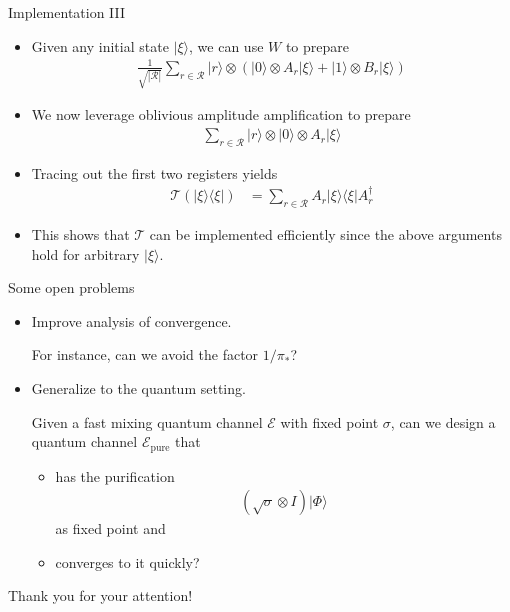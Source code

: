 \documentclass{beamer}
\renewcommand{\>}{\rangle}
\newcommand{\<}{\langle}
\newcommand{\cT}{\mathcal{T}}
\newcommand{\cR}{\mathcal{R}}
\begin{document}

\begin{frame}{Implementation III}
\begin{itemize}
    \item Given any initial state $|\xi\>$, we can use $W$ to prepare
    \begin{align*}
        \frac{1}{\sqrt{|\cR|}} 
        \sum_{r\in\cR}
        |r\> \otimes 
        (|0\> \otimes A_r|\xi\> + |1\> \otimes B_r|\xi\>) 
    \end{align*}

    \medskip
    \item We now leverage oblivious amplitude amplification to prepare
    \begin{align*}
        \sum_{r\in\cR} |r\> \otimes |0\> \otimes A_r|\xi\> 
    \end{align*}

    \item Tracing out the first two registers yields
    \begin{align*}
        \cT(|\xi\>\<\xi|)
        &=
        \sum_{r\in\cR} A_r |\xi\>\<\xi| A_r^\dagger
    \end{align*}

    \medskip
    \item This shows that $\cT$ can be implemented efficiently since the above arguments hold for arbitrary $|\xi\>$.
\end{itemize}
\end{frame}


\begin{frame}{Some open problems}
\begin{itemize}
    \item Improve analysis of convergence.

    \medskip
    For instance, can we avoid the factor $1/\pi_*$?

    \bigskip
    \item Generalize to the quantum setting.

    \medskip
    Given a fast mixing quantum channel $\mathcal{E}$ with fixed point $\sigma$, can we design a quantum channel $\mathcal{E}_\mathrm{pure}$ that 
    
    \medskip
    \begin{itemize}
    \item[(i)] has the purification
    \begin{align*}
        (\sqrt{\sigma} \otimes I) |\Phi\>
    \end{align*}
    as fixed point and

    \medskip
    \item[(ii)] converges to it quickly?
    \end{itemize}
\end{itemize}
\end{frame}


\begin{frame}{Thank you for your attention!}

\end{frame}
\end{document}

